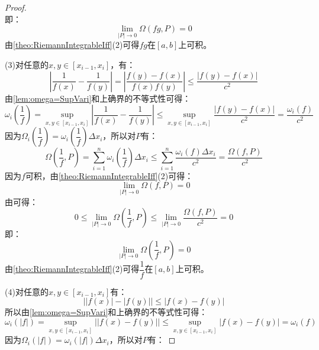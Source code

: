 \begin{proof}
\begin{equation*}
	\end{equation*}
	即：
	\begin{equation*}
		\lim_{|P|\to0}\Omega(fg,P)=0
	\end{equation*}
	由\cref{theo:RiemannIntegrableIff}(2)可得$fg$在$[a,b]$上可积。\par
	(3)对任意的$x,y\in[x_{i-1},x_i]$，有：
	\begin{equation*}
		\left|\frac{1}{f(x)}-\frac{1}{f(y)}\right|=\left|\frac{f(y)-f(x)}{f(x)f(y)}\right|\leqslant\frac{|f(y)-f(x)|}{c^2}
	\end{equation*}
	由\cref{lem:omega=SupVari}和上确界的不等式性可得：
	\begin{equation*}
		\omega_i\left(\frac{1}{f}\right)=\sup_{x,y\in[x_{i-1},x_i]}\left|\frac{1}{f(x)}-\frac{1}{f(y)}\right|\leqslant\sup_{x,y\in[x_{i-1},x_i]}\frac{|f(y)-f(x)|}{c^2}=\frac{\omega_i(f)}{c^2}
	\end{equation*}
	因为$\Omega_i\left(\dfrac{1}{f}\right)=\omega_i\left(\dfrac{1}{f}\right)\Delta x_i$，所以对$P$有：
	\begin{equation*}
		\Omega\left(\dfrac{1}{f},P\right)=\sum_{i=1}^{n}\omega_i\left(\dfrac{1}{f}\right)\Delta x_i\leqslant\sum_{i=1}^{n}\frac{\omega_i(f)\Delta x_i}{c^2}=\frac{\Omega(f,P)}{c^2}
	\end{equation*}
	因为$f$可积，由\cref{theo:RiemannIntegrableIff}(2)可得：
	\begin{equation*}
		\lim_{|P|\to0}\Omega(f,P)=0
	\end{equation*}
	由可得：
	\begin{equation*}
		0\leqslant\lim_{|P|\to0}\Omega\left(\frac{1}{f},P\right)\leqslant\lim_{|P|\to0}\frac{\Omega(f,P)}{c^2}=0
	\end{equation*}
	即：
	\begin{equation*}
		\lim_{|P|\to0}\Omega\left(\frac{1}{f},P\right)=0
	\end{equation*}
	由\cref{theo:RiemannIntegrableIff}(2)可得$\dfrac{1}{f}$在$[a,b]$上可积。\par
	(4)对任意的$x,y\in[x_{i-1},x_i]$有：
	\begin{equation*}
		\Big||f(x)|-|f(y)|\Big|\leqslant|f(x)-f(y)|
	\end{equation*}
	所以由\cref{lem:omega=SupVari}和上确界的不等式性可得：
	\begin{equation*}
		\omega_i(|f|)=\sup_{x,y\in[x_{i-1},x_i]}\Big||f(x)-f(y)|\Big|\leqslant\sup_{x,y\in[x_{i-1},x_i]}|f(x)-f(y)|=\omega_i(f)
	\end{equation*}
	因为$\Omega_i(|f|)=\omega_i(|f|)\Delta x_i$，所以对$P$有：

\end{proof}
